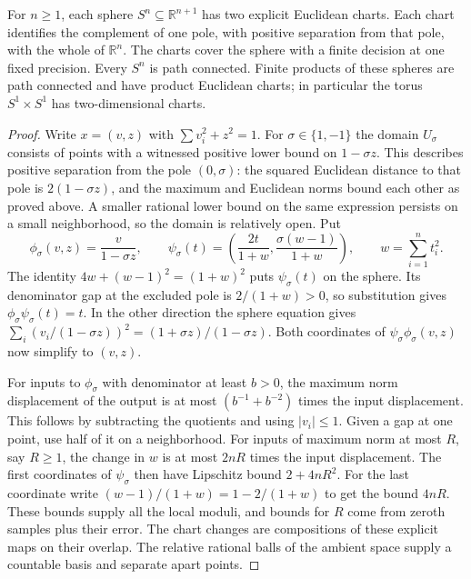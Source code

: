 \begin{theorem}\label{thm:stereographic}\label{idx-metric438}
For $n\ge1$, each sphere $S^n\subseteq\mathbb R^{n+1}$ has two explicit
Euclidean charts. Each chart identifies the complement of one pole,
with positive separation from that pole, with the whole of $\mathbb R^n$.
The charts cover the sphere with a finite decision at one fixed precision.
Every $S^n$ is path connected. Finite products of these spheres are
path connected and have product Euclidean charts; in particular the torus
$S^1\times S^1$ has two-dimensional charts.
\end{theorem}
\begin{proof}
Write $x=(v,z)$ with $\sum v_i^2+z^2=1$. For
$\sigma\in\{1,-1\}$ the domain $U_\sigma$ consists of points with
a witnessed positive lower bound on $1-\sigma z$. This describes
positive separation from the pole $(0,\sigma)$:
the squared Euclidean distance to that pole is $2(1-\sigma z)$, and
the maximum and Euclidean norms bound each other as proved above. A
smaller rational lower bound on the same expression persists on a small
neighborhood, so the domain is relatively open. Put
\[
 \phi_\sigma(v,z)=\frac{v}{1-\sigma z},\qquad
 \psi_\sigma(t)=
 \left(\frac{2t}{1+w},\frac{\sigma(w-1)}{1+w}\right),
 \qquad w=\sum_{i=1}^n t_i^2 .
\]
The identity $4w+(w-1)^2=(1+w)^2$ puts $\psi_\sigma(t)$ on the sphere.
Its denominator gap at the excluded pole is $2/(1+w)>0$, so substitution
gives $\phi_\sigma\psi_\sigma(t)=t$. In the other direction the sphere
equation gives
$\sum_i (v_i/(1-\sigma z))^2=(1+\sigma z)/(1-\sigma z)$.
Both coordinates of $\psi_\sigma\phi_\sigma(v,z)$ now simplify to
$(v,z)$.

For inputs to $\phi_\sigma$ with denominator at least $b>0$, the maximum
norm displacement of the output is at most $(b^{-1}+b^{-2})$ times the
input displacement. This follows by subtracting the quotients and using
$|v_i|\le1$. Given a gap at one point, use half of it on a neighborhood.
For inputs of maximum norm at most $R$, say $R\ge1$, the change in $w$
is at most $2nR$ times the input displacement. The first coordinates of
$\psi_\sigma$ then have Lipschitz bound $2+4nR^2$. For the last coordinate
write $(w-1)/(1+w)=1-2/(1+w)$ to get the bound $4nR$. These bounds
supply all the local moduli, and bounds for $R$ come from zeroth samples
plus their error. The chart changes are compositions of these explicit
maps on their overlap. The relative rational balls of the ambient space
supply a countable basis and separate apart points.


\end{proof}
